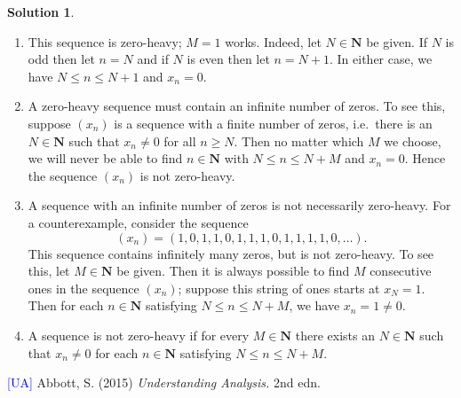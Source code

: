 \documentclass[12pt]{article}
\theoremstyle{definition}
\theoremstyle{exercise}
\theoremstyle{solution}
\newtheorem*{solution}{Solution}
\newcommand{\N}{\mathbf{N}}
\begin{document}
\begin{solution}
    \begin{enumerate}
        \item This sequence is zero-heavy; \( M = 1 \) works. Indeed, let \( N \in \N \) be given. If \( N \) is odd then let \( n = N \) and if \( N \) is even then let \( n = N + 1 \). In either case, we have \( N \leq n \leq N + 1 \) and \( x_n = 0 \).

        \item A zero-heavy sequence must contain an infinite number of zeros. To see this, suppose \( (x_n) \) is a sequence with a finite number of zeros, i.e.\ there is an \( N \in \N \) such that \( x_n \neq 0 \) for all \( n \geq N \). Then no matter which \( M \) we choose, we will never be able to find \( n \in \N \) with \( N \leq n \leq N + M \) and \( x_n = 0 \). Hence the sequence \( (x_n) \) is not zero-heavy.

        \item A sequence with an infinite number of zeros is not necessarily zero-heavy. For a counterexample, consider the sequence
        \[
            (x_n) = (1, 0, 1, 1, 0, 1, 1, 1, 0, 1, 1, 1, 1, 0, \ldots).
        \]
        This sequence contains infinitely many zeros, but is not zero-heavy. To see this, let \( M \in \N \) be given. Then it is always possible to find \( M \) consecutive ones in the sequence \( (x_n) \); suppose this string of ones starts at \( x_N = 1 \). Then for each \( n \in \N \) satisfying \( N \leq n \leq N + M \), we have \( x_n = 1 \neq 0 \).

        \item A sequence is not zero-heavy if for every \( M \in \N \) there exists an \( N \in \N \) such that \( x_n \neq 0 \) for each \( n \in \N \) satisfying \( N \leq n \leq N + M \).
    \end{enumerate}
\end{solution}

\noindent \hrulefill

\noindent \hypertarget{ua}{\textcolor{blue}{[UA]} Abbott, S. (2015) \textit{Understanding Analysis.} 2nd edn.}
\end{document}
